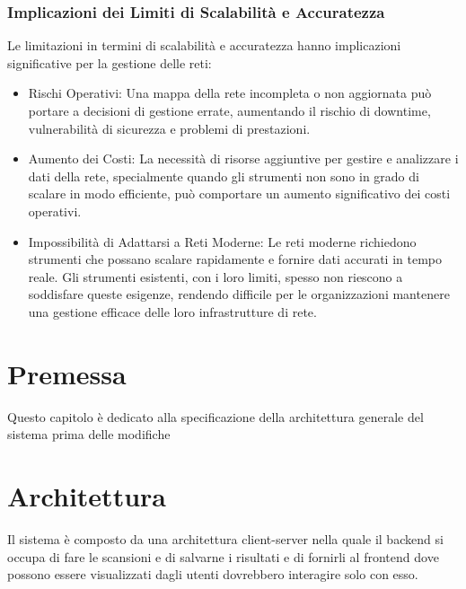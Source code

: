 \documentclass[target=bach,aauheader=,style=]{thud}
\begin{document}
\subsubsection{Implicazioni dei Limiti di Scalabilità e Accuratezza}
Le limitazioni in termini di scalabilità e accuratezza hanno implicazioni significative per la gestione delle reti:
\begin{itemize}
  \item Rischi Operativi: Una mappa della rete incompleta o non aggiornata può portare a decisioni di gestione errate, aumentando il rischio di downtime, vulnerabilità di sicurezza e problemi di prestazioni.
  \item Aumento dei Costi: La necessità di risorse aggiuntive per gestire e analizzare i dati della rete, specialmente quando gli strumenti non sono in grado di scalare in modo efficiente, può comportare un aumento significativo dei costi operativi.
  \item Impossibilità di Adattarsi a Reti Moderne: Le reti moderne richiedono strumenti che possano scalare rapidamente e fornire dati accurati in tempo reale. Gli strumenti esistenti, con i loro limiti, spesso non riescono a soddisfare queste esigenze, rendendo difficile per le organizzazioni mantenere una gestione efficace delle loro infrastrutture di rete.
\end{itemize}







\section{Premessa}
Questo capitolo è dedicato alla specificazione della architettura generale del sistema prima delle modifiche 

\section{Architettura}
Il sistema è composto da una architettura client-server nella quale il backend si occupa di fare le scansioni e di salvarne i risultati e di fornirli al frontend dove possono essere visualizzati dagli utenti dovrebbero interagire solo con esso. 
\end{document}

